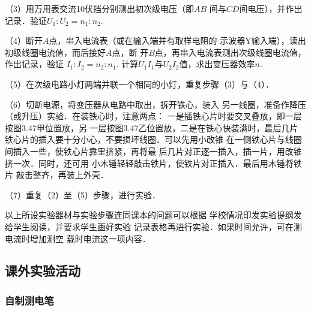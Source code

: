 （3）用万用表交流10伏挡分别测出初次级电压（即$AB$
间与$CD$间电压），并作出记录．验证$U_1:U_2=n_1:n_2$.

（4）断开$A$点，串入电流表（或在输入端并有取样电阻的
示波器Y输入端），读出初级线圈电流值，而后接好$A$点，断
开$B$点，再串入电流表测出次级线圈电流值，作出记录，验证
$I_1:I_2=n_2:n_1$. 计算$U_1I_1$与$U_2I_2$值，求出变压器效率$n$.

（5）在次级电路小灯两端并联一个相同的小灯，重复步骤（3）与（4）．

（6）切断电源，将变压器从电路中取出，拆开铁心，装入
另一线圈，准备作降压（或升压）实验．在装铁心时，注意两点：
一是插铁心片时要交叉叠放，即一层按图3.47甲位置放，另
一层按图3.47乙位置放，二是在铁心快装满时，最后几片
铁心片的插入要十分小心，不要损坏线圈．可以先用小改锥
在一侧铁心片与线圈间插入一些，使铁心片靠里挤紧，再将最
后几片对正逐一插入，插一片，用改锥挤一次．同时，还可用
小木锤轻轻敲击铁片，使铁片对正插入．最后用木锤将铁片
敲击整齐，再装上外壳．

\begin{figure}[htp]
    \centering
    \caption{}
\end{figure}

（7）重复（2）至（5）步骤，进行实验．

以上所设实验器材与实验步骤连同课本的问题可以根据
学校情况印发实验提纲发给学生阅读，并要求学生画好实验
记录表格再进行实验．如果时间允许，可在测电流时增加测空
载时电流这一项内容．

\subsection{课外实验活动}
\subsubsection{自制测电笔}

